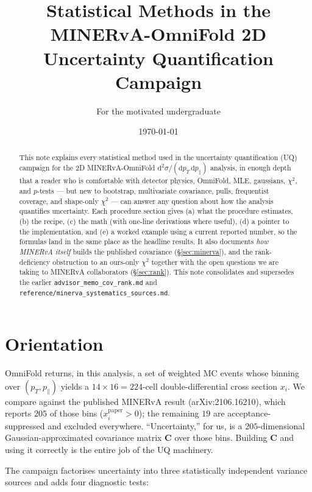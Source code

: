 \documentclass[12pt]{article}
\title{Statistical Methods in the\\
       MINERvA-OmniFold 2D Uncertainty Quantification Campaign}
\author{For the motivated undergraduate}
\date{\today}
\newcommand{\pT}{p_{T}}
\newcommand{\pPar}{p_{\parallel}}
\newcommand{\paper}{\text{paper}}
\begin{document}
\maketitle

\begin{abstract}
This note explains every statistical method used in the uncertainty
quantification (UQ) campaign for the 2D MINERvA-OmniFold
$\mathrm{d}^{2}\sigma/(\mathrm{d}\pT\,\mathrm{d}\pPar)$ analysis, in
enough depth that a reader who is comfortable with detector physics,
OmniFold, MLE, gaussians, $\chi^{2}$, and $p$-tests --- but new to
bootstrap, multivariate covariance, pulls, frequentist coverage, and
shape-only $\chi^{2}$ --- can answer any question about how the
analysis quantifies uncertainty. Each procedure section gives (a) what
the procedure estimates, (b) the recipe, (c) the math (with one-line
derivations where useful), (d) a pointer to the implementation, and
(e) a worked example using a current reported number, so the formulas
land in the same place as the headline results. It also documents
\emph{how MINERvA itself} builds the published covariance
(\S\ref{sec:minerva}), and the rank-deficiency obstruction to an
ours-only $\chi^{2}$ together with the open questions we are taking to
MINERvA collaborators (\S\ref{sec:rank}). This note consolidates and
supersedes the earlier \texttt{advisor\_memo\_cov\_rank.md} and
\texttt{reference/minerva\_systematics\_sources.md}.
\end{abstract}

\tableofcontents

\section{Orientation}
\label{sec:orient}

OmniFold returns, in this analysis, a set of weighted MC events whose
binning over $(\pT, \pPar)$ yields a $14 \times 16 = 224$-cell
double-differential cross section $x_{i}$. We compare against the
published MINERvA result (arXiv:2106.16210), which reports $205$ of
those bins ($x^{\paper}_{i} > 0$); the remaining $19$ are acceptance-
suppressed and excluded everywhere. ``Uncertainty,'' for us, is a
$205$-dimensional Gaussian-approximated covariance matrix
$\mathbf{C}$ over those bins. Building $\mathbf{C}$ and using it
correctly is the entire job of the UQ machinery.

The campaign factorises uncertainty into three statistically
independent variance sources and adds four diagnostic tests:
\end{document}
